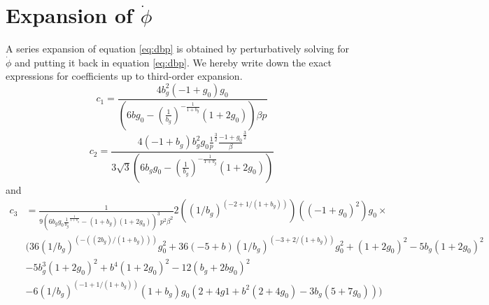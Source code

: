 \documentclass[12pt,a4paper]{article}
\numberwithin{equation}{section}
\numberwithin{equation}{section}
\begin{document}
\section{Expansion of \texorpdfstring{ $\dot{\phi}$}{dp}}
A series expansion of equation \eqref{eq:dbp} is obtained by perturbatively solving for $\dot{\phi}$ and putting it back in equation \eqref{eq:dbp}. We hereby write down the exact expressions for coefficients up to third-order expansion. 
\label{app:dphi}
\begin{equation}
     c_1 = \frac{4 b_g^2 (-1+g_0)g_0}{\left(6b g_0-\left(\frac{1}{b_g}\right)^{-\frac{1}{1+b_g}}(1+2 g_0) \right) \beta p}
     \label{eq:c1}
\end{equation}
\begin{equation}
    c_2 = \frac{4(-1+b_g)b_g^{2}g_0\frac{1}{p}^{\frac{3}{2}}\frac{-1+g_0}{\beta}^{\frac{3}{2}}}{3\sqrt{3}\left(6b_g g_0-\left(\frac{1}{b_g}\right)^{-\frac{1}{1+b_g}}(1+2 g_0) \right) }
    \label{eq:c2}
\end{equation}
and
\begin{equation}
\begin{split}
   c_3 &= \frac{1}{9 \left(6b_g g_0 \frac{1}{b_g}^{\frac{1}{1+b_g}}-(1+b_g)(1+2 g_0)\right)^3 p^2 \beta^2} 2 ((1/b_g)^{(-2 + 1/(1 + b_g))}) ((-1 + g_0)^2) g_0 \times \\
   & (36 (1/b_g)^{(-((2 b_g)/(1 + b_g)))} g_0^2 + 
 36 (-5 + b) (1/b_g)^{(-3 + 2/(1 + b_g))} g_0^2 +(1 + 2 g_0)^2 - 5 b_g (1 + 2 g_0)^2 \\
 &- 5 b_g^3 (1 + 2 g_0)^2+b^4 (1 + 2 g_0)^2 - 12 (b_g + 2 b g_0)^2 \\
 &-6 (1/b_g)^{(-1 + 1/(
  1 + b_g))} (1 + b_g) g_0 (2 + 4 g1 + b^2 (2 + 4 g_0) - 3 b_g (5 + 7 g_0)))
   \end{split}
\end{equation}

\label{beb} 


\end{document}
